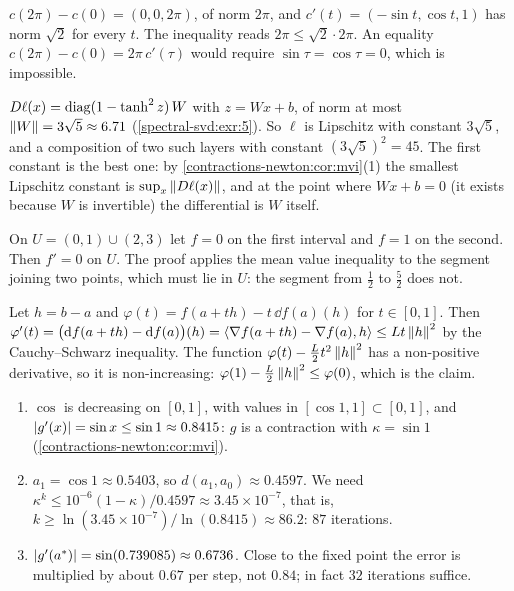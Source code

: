\section{}

$c(2\pi) - c(0) = (0, 0, 2\pi)$, of norm $2\pi$, and
$c'(t) = (-\sin t, \cos t, 1)$ has norm $\sqrt2$ for every $t$. The
inequality reads $2\pi\leq\sqrt2\cdot2\pi$. An equality
$c(2\pi) - c(0) = 2\pi\,c'(\tau)$ would require
$\sin\tau = \cos\tau = 0$, which is impossible.

$D\ell(x) = \operatorname{diag}(1 - \tanh^2z)\,W$ with $z = Wx + b$, of norm at most
$\left\|W\right\| = 3\sqrt5\approx6.71$ (\cref{spectral-svd:exr:5}). So $\ell$ is
Lipschitz with constant $3\sqrt5$, and a composition of two such layers
with constant $(3\sqrt5)^2 = 45$. The first constant is the best one: by
\cref{contractions-newton:cor:mvi}(1) the smallest Lipschitz constant is
$\sup_x\left\|D\ell(x)\right\|$, and at the point where $Wx + b = 0$ (it exists
because $W$ is invertible) the differential is $W$ itself.

On $U = (0, 1)\cup(2, 3)$ let $f = 0$ on the first interval and $f = 1$
on the second. Then $f' = 0$ on $U$. The proof applies the mean value
inequality to the segment joining two points, which must lie in $U$: the
segment from $\frac12$ to $\frac52$ does not.

Let $h = b - a$ and $\varphi(t) = f(a + th) - t\,\dd f(a)(h)$ for
$t\in[0, 1]$. Then
$\varphi'(t) = \bigl(\mathrm{d} f(a + th) - \mathrm{d} f(a)\bigr)(h)
= \left\langle \nabla f(a + th) - \nabla f(a), h \right\rangle\leq Lt\left\|h\right\|^2$ by the
Cauchy--Schwarz inequality. The function
$\varphi(t) - \frac L2t^2\left\|h\right\|^2$ has a non-positive derivative, so it
is non-increasing:
$\varphi(1) - \frac L2\left\|h\right\|^2\leq\varphi(0)$, which is the claim.

\begin{enumerate}[nosep]
  \item $\cos$ is decreasing on $[0, 1]$, with values in
        $[\cos1, 1]\subset[0, 1]$, and
        $\left|g'(x)\right| = \sin x\leq\sin1\approx0.8415$: $g$ is a contraction
        with $\kappa = \sin1$ (\cref{contractions-newton:cor:mvi}).
  \item $a_1 = \cos1\approx0.5403$, so $d(a_1, a_0)\approx0.4597$. We
        need $\kappa^k\leq10^{-6}(1 - \kappa)/0.4597\approx3.45\times10^{-7}$,
        that is, $k\geq\ln(3.45\times10^{-7})/\ln(0.8415)\approx86.2$:
        $87$ iterations.
  \item $\left|g'(a^*)\right| = \sin(0.739085)\approx0.6736$. Close to the fixed
        point the error is multiplied by about $0.67$ per step, not
        $0.84$; in fact $32$ iterations suffice.
\end{enumerate}


